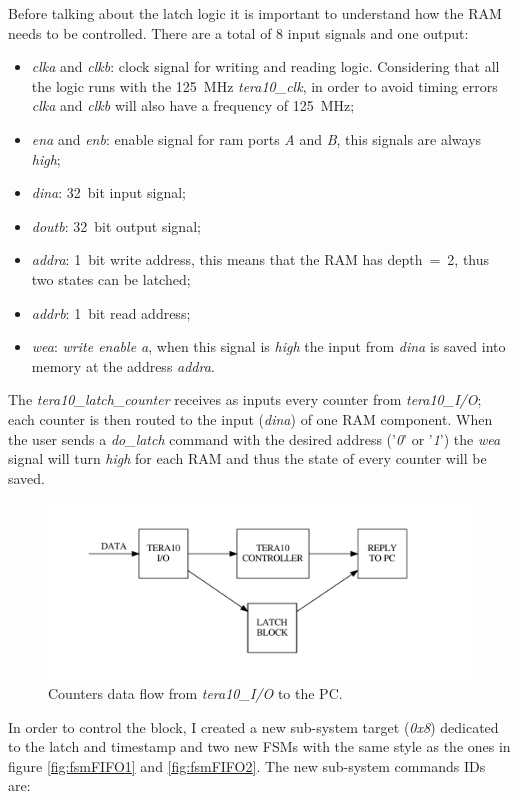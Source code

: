 \noindent Before talking about the latch logic it is important to understand how the RAM needs to be controlled. There are a total of 8 input signals and one output:
\begin{itemize}
	\item \textit{clka} and \textit{clkb}: clock signal for writing and reading logic. Considering that all the logic runs with the 125~MHz \textit{tera10\_clk}, in order to avoid timing errors \textit{clka} and \textit{clkb} will also have a frequency of 125~MHz;
	\item \textit{ena} and \textit{enb}: enable signal for ram ports \textit{A} and \textit{B}, this signals are always \textit{high};
	\item \textit{dina}: 32~bit input signal;
	\item \textit{doutb}: 32~bit output signal;
	\item \textit{addra}: 1~bit write address, this means that the RAM has depth~=~2, thus two states can be latched;
	\item \textit{addrb}: 1~bit read address;
	\item \textit{wea}: \textit{write enable a}, when this signal is \textit{high} the input from \textit{dina} is saved into memory at the address \textit{addra}.
\end{itemize} 
\noindent The \textit{tera10\_latch\_counter} receives as inputs every counter from \textit{tera10\_I/O}; each counter is then routed to the input (\textit{dina}) of one RAM component. When the user sends a \textit{do\_latch} command with the desired address ('\textit{0}' or '\textit{1}') the \textit{wea} signal will turn \textit{high} for each RAM and thus the state of every counter will be saved.
\begin{figure}[H]
	\centering
	\includegraphics[width=0.7\linewidth]{FSMdiagrams/latch_counter.pdf}
	\caption{Counters data flow from \textit{tera10\_I/O} to the PC.}
	\label{fig:latch_counter}
\end{figure}
\noindent In order to control the block, I created a new sub-system target (\textit{0x8}) dedicated to the latch and timestamp and two new FSMs with the same style as the ones in figure \ref{fig:fsmFIFO1} and \ref{fig:fsmFIFO2}. The new sub-system commands IDs are:
